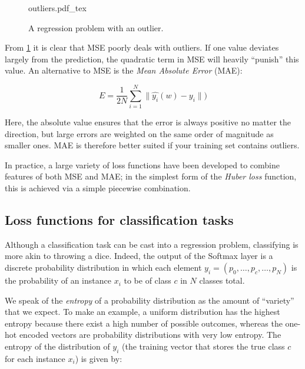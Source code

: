 \begin{figure}[htb]
    \centering
    \def\svgwidth{0.5\textwidth}
    {outliers.pdf_tex}
    \caption{A regression problem with an outlier.\label{fig:outliers}}
\end{figure}

From \cref{fig:outliers} it is clear that MSE poorly deals with outliers. If one value deviates largely from the prediction, the quadratic term in MSE will heavily ``punish'' this value. An alternative to MSE is the \textsl{Mean Absolute Error} (MAE):

\begin{equation}
E=\frac{1}{2N}\sum_{i=1}^N\|\hat{y_i}(w)-y_i\|)
\end{equation}

Here, the absolute value ensures that the error is always positive no matter the direction, but large errors are weighted on the same order of magnitude as smaller ones. MAE is therefore better suited if your training set contains outliers.

In practice, a large variety of loss functions have been developed to combine features of both MSE and MAE; in the simplest form of the \textsl{Huber loss} function, this is achieved via a simple piecewise combination.

\subsection{Loss functions for classification tasks}

Although a classification task can be cast into a regression problem, classifying is more akin to throwing a dice.
Indeed, the output of the Softmax layer is a discrete probability distribution in which each element $y_i=(p_0, \dots, p_c, \dots ,p_N)$ is the probability of an instance $x_i$ to be of class $c$ in $N$ classes total.

We speak of the \textsl{entropy} of a probability distribution as the amount of ``variety'' that we expect.
To make an example, a uniform distribution has the highest entropy because there exist a high number of possible outcomes, whereas the one-hot encoded vectors are probability distributions with very low entropy.
The entropy of the distribution of $y_i$ (the training vector that stores the true class $c$ for each instance $x_i$) is given by:

